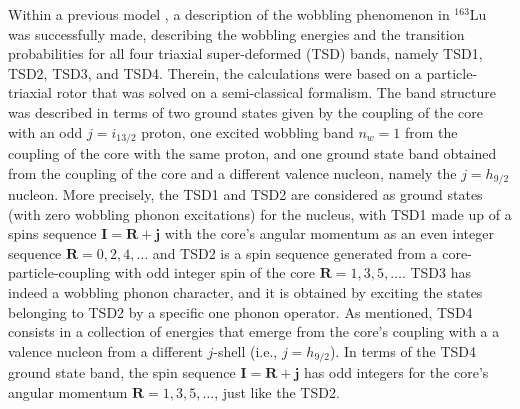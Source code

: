 \documentclass[%
 reprint,
 amsmath,
 amssymb,
 aps,
]{revtex4-2}
\begin{document}
Within a previous model \cite{raduta2020towards}, a description of the wobbling phenomenon in $^{163}$Lu was successfully made, describing the wobbling energies and the transition probabilities for all four triaxial super-deformed (TSD) bands, namely TSD1, TSD2, TSD3, and TSD4. Therein, the calculations were based on a particle-triaxial rotor that was solved on a semi-classical formalism. The band structure was described in terms of two ground states given by the coupling of the core with an odd $j=i_{13/2}$ proton, one excited wobbling band $n_w=1$ from the coupling of the core with the same proton, and one ground state band obtained from the coupling of the core and a different valence nucleon, namely the $j=h_{9/2}$ nucleon. More precisely, the TSD1 and TSD2 are considered as ground states (with zero wobbling phonon excitations) for the nucleus, with TSD1 made up of a spins sequence $\mathbf{I}=\mathbf{R}+\mathbf{j}$ with the core's angular momentum as an even integer sequence $\mathbf{R}=0,2,4,\dots$ and TSD2 is a spin sequence generated from a core-particle-coupling with odd integer spin of the core $\mathbf{R}=1,3,5,\dots$. TSD3 has indeed a wobbling phonon character, and it is obtained by exciting the states belonging to TSD2 by a specific one phonon operator. As mentioned, TSD4 consists in a collection of energies that emerge from the core's coupling with a a valence nucleon from a different $j$-shell (i.e., $j=h_{9/2}$). In terms of the TSD4 ground state band, the spin sequence $\mathbf{I}=\mathbf{R}+\mathbf{j}$ has odd integers for the core's angular momentum $\mathbf{R}=1,3,5,\dots$, just like the TSD2.
\end{document}
